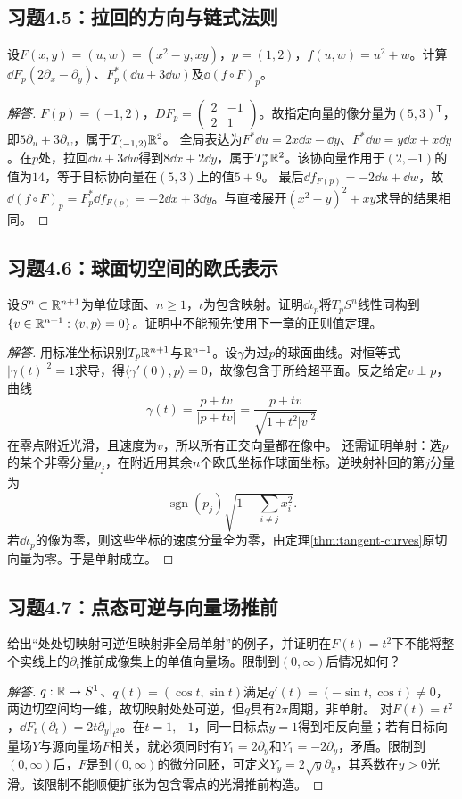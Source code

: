 \subsection*{习题4.5：拉回的方向与链式法则}
设$F(x,y)=(u,w)=(x^2-y,xy)$，$p=(1,2)$，$f(u,w)=u^2+w$。计算$\dd F_p(2\partial_x-\partial_y)$、$F_p^*(\dd u+3\dd w)$及$\dd(f\circ F)_p$。
\begin{proof}[解答]
$F(p)=(-1,2)$，$D F_p=\left(\begin{smallmatrix}2&-1\\2&1\end{smallmatrix}\right)$。故指定向量的像分量为$(5,3)^{\mathsf T}$，即$5\partial_u+3\partial_w$，属于$T_{(-1,2)}\mathbb{R}^2$。
全局表达为$F^*\dd u=2x\dd x-\dd y$、$F^*\dd w=y\dd x+x\dd y$。在$p$处，拉回$\dd u+3\dd w$得到$8\dd x+2\dd y$，属于$T_p^*\mathbb{R}^2$。该协向量作用于$(2,-1)$的值为$14$，等于目标协向量在$(5,3)$上的值$5+9$。
最后$\dd f_{F(p)}=-2\dd u+\dd w$，故$\dd(f\circ F)_p=F_p^*\dd f_{F(p)}=-2\dd x+3\dd y$。与直接展开$(x^2-y)^2+xy$求导的结果相同。
\end{proof}

\subsection*{习题4.6：球面切空间的欧氏表示}
设$S^n\subset\mathbb{R}^{n+1}$为单位球面、$n\geq1$，$\iota$为包含映射。证明$\dd\iota_p$将$T_pS^n$线性同构到$\{v\in\mathbb{R}^{n+1}:\langle v,p\rangle=0\}$。证明中不能预先使用下一章的正则值定理。
\begin{proof}[解答]
用标准坐标识别$T_p\mathbb{R}^{n+1}$与$\mathbb{R}^{n+1}$。设$\gamma$为过$p$的球面曲线。对恒等式$|\gamma(t)|^2=1$求导，得$\langle\gamma'(0),p\rangle=0$，故像包含于所给超平面。反之给定$v\perp p$，曲线
\[
 \gamma(t)=\frac{p+tv}{|p+tv|}=\frac{p+tv}{\sqrt{1+t^2|v|^2}}
\]
在零点附近光滑，且速度为$v$，所以所有正交向量都在像中。
还需证明单射：选$p$的某个非零分量$p_j$，在附近用其余$n$个欧氏坐标作球面坐标。逆映射补回的第$j$分量为
\[
 \operatorname{sgn}(p_j)\sqrt{1-\sum_{i\ne j}x_i^2}.
\]
若$\dd\iota_p$的像为零，则这些坐标的速度分量全为零，由定理\ref{thm:tangent-curves}原切向量为零。于是单射成立。
\end{proof}

\subsection*{习题4.7：点态可逆与向量场推前}
给出“处处切映射可逆但映射非全局单射”的例子，并证明在$F(t)=t^2$下不能将整个实线上的$\partial_t$推前成像集上的单值向量场。限制到$(0,\infty)$后情况如何？
\begin{proof}[解答]
$q:\mathbb{R}\to S^1$、$q(t)=(\cos t,\sin t)$满足$q'(t)=(-\sin t,\cos t)\ne0$，两边切空间均一维，故切映射处处可逆，但$q$具有$2\pi$周期，非单射。
对$F(t)=t^2$，$\dd F_t(\partial_t)=2t\partial_y|_{t^2}$。在$t=1,-1$，同一目标点$y=1$得到相反向量；若有目标向量场$Y$与源向量场$F$相关，就必须同时有$Y_1=2\partial_y$和$Y_1=-2\partial_y$，矛盾。限制到$(0,\infty)$后，$F$是到$(0,\infty)$的微分同胚，可定义$Y_y=2\sqrt y\partial_y$，其系数在$y>0$光滑。该限制不能顺便扩张为包含零点的光滑推前构造。
\end{proof}

